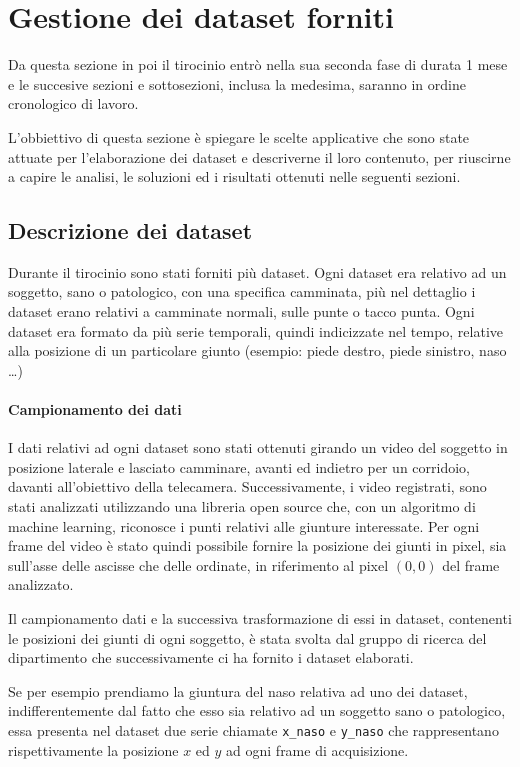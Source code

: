 \section{Gestione dei dataset forniti}
Da questa sezione in poi il tirocinio entrò nella sua seconda fase di durata 1 mese e le succesive
sezioni e sottosezioni, inclusa la medesima, saranno in ordine cronologico di lavoro.

L'obbiettivo di questa sezione è spiegare le scelte applicative che sono state attuate
per l'elaborazione dei dataset e descriverne il loro contenuto, per 
riuscirne a capire le analisi, le soluzioni ed i risultati ottenuti nelle seguenti sezioni. 




\subsection{Descrizione dei dataset}
Durante il tirocinio sono stati forniti più dataset.
Ogni dataset era relativo ad un soggetto, sano o patologico, con una specifica camminata,
più nel dettaglio i dataset erano relativi a camminate normali, sulle punte o tacco punta.
Ogni dataset era formato da più serie temporali, quindi indicizzate nel tempo, relative
alla posizione di un particolare giunto (esempio: piede destro, piede sinistro, naso \dots)

\paragraph{Campionamento dei dati} I dati relativi ad ogni dataset sono stati ottenuti girando un video del soggetto in posizione
laterale e lasciato camminare, avanti ed indietro per un corridoio, davanti all'obiettivo della telecamera. 
Successivamente, i video registrati, sono stati analizzati utilizzando una libreria open source che, con un algoritmo
di machine learning, riconosce i punti relativi alle giunture interessate. Per ogni frame del video
è stato quindi possibile fornire la posizione dei giunti in pixel, sia sull'asse delle
ascisse che delle ordinate, in riferimento al pixel $(0,0)$ del frame analizzato.

Il campionamento dati e la successiva trasformazione di essi in dataset, contenenti le posizioni
dei giunti di ogni soggetto, è stata svolta dal gruppo di ricerca del dipartimento che successivamente
ci ha fornito i dataset elaborati.


\begin{esempio}
    Se per esempio prendiamo la giuntura del naso relativa ad uno dei dataset, indifferentemente
    dal fatto che esso sia relativo ad un soggetto sano o patologico, essa presenta nel dataset due serie
    chiamate \texttt{x\_naso} e \texttt{y\_naso} che rappresentano rispettivamente 
    la posizione $x$ ed $y$ ad ogni frame di acquisizione.
\end{esempio}

